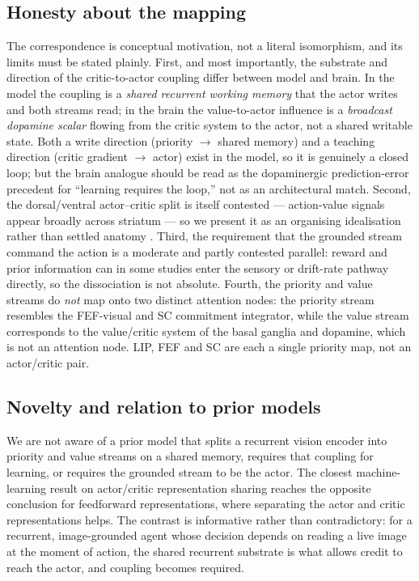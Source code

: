 \subsection{Honesty about the mapping}
The correspondence is conceptual motivation, not a literal isomorphism, and its limits must be stated plainly. First, and most importantly, the substrate and direction of the critic-to-actor coupling differ between model and brain. In the model the coupling is a \emph{shared recurrent working memory} that the actor writes and both streams read; in the brain the value-to-actor influence is a \emph{broadcast dopamine scalar} flowing from the critic system to the actor, not a shared writable state. Both a write direction (priority $\rightarrow$ shared memory) and a teaching direction (critic gradient $\rightarrow$ actor) exist in the model, so it is genuinely a closed loop; but the brain analogue should be read as the dopaminergic prediction-error precedent for ``learning requires the loop,'' not as an architectural match. Second, the dorsal/ventral actor--critic split is itself contested --- action-value signals appear broadly across striatum --- so we present it as an organising idealisation rather than settled anatomy \citep{maia2009reinforcement}. Third, the requirement that the grounded stream command the action is a moderate and partly contested parallel: reward and prior information can in some studies enter the sensory or drift-rate pathway directly, so the dissociation is not absolute. Fourth, the priority and value streams do \emph{not} map onto two distinct attention nodes: the priority stream resembles the FEF-visual and SC commitment integrator, while the value stream corresponds to the value/critic system of the basal ganglia and dopamine, which is not an attention node. LIP, FEF and SC are each a single priority map, not an actor/critic pair.

\subsection{Novelty and relation to prior models}
We are not aware of a prior model that splits a recurrent vision encoder into priority and value streams on a shared memory, requires that coupling for learning, or requires the grounded stream to be the actor. The closest machine-learning result on actor/critic representation sharing reaches the opposite conclusion for feedforward representations, where separating the actor and critic representations helps. The contrast is informative rather than contradictory: for a recurrent, image-grounded agent whose decision depends on reading a live image at the moment of action, the shared recurrent substrate is what allows credit to reach the actor, and coupling becomes required.

